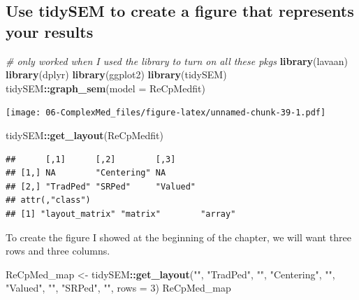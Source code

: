\documentclass[
  11pt,
]{book}
\newenvironment{Shaded}{\begin{snugshade}}{\end{snugshade}}
\newcommand{\AttributeTok}[1]{\textcolor[rgb]{0.27,0.27,0.27}{#1}}
\newcommand{\CommentTok}[1]{\textcolor[rgb]{0.37,0.37,0.37}{\textit{#1}}}
\newcommand{\DecValTok}[1]{\textcolor[rgb]{0.06,0.06,0.06}{#1}}
\newcommand{\FunctionTok}[1]{\textcolor[rgb]{0.27,0.27,0.27}{\textbf{#1}}}
\newcommand{\NormalTok}[1]{#1}
\newcommand{\OtherTok}[1]{\textcolor[rgb]{0.37,0.37,0.37}{#1}}
\newcommand{\SpecialCharTok}[1]{\textcolor[rgb]{0.43,0.43,0.43}{\textbf{#1}}}
\newcommand{\StringTok}[1]{\textcolor[rgb]{0.5,0.5,0.5}{#1}}
\begin{document}
\hypertarget{use-tidysem-to-create-a-figure-that-represents-your-results-1}{%
\subsection*{Use tidySEM to create a figure that represents your results}\label{use-tidysem-to-create-a-figure-that-represents-your-results-1}}


\begin{Shaded}
\begin{Highlighting}[]
\CommentTok{\# only worked when I used the library to turn on all these pkgs}
\FunctionTok{library}\NormalTok{(lavaan)}
\FunctionTok{library}\NormalTok{(dplyr)}
\FunctionTok{library}\NormalTok{(ggplot2)}
\FunctionTok{library}\NormalTok{(tidySEM)}
\NormalTok{tidySEM}\SpecialCharTok{::}\FunctionTok{graph\_sem}\NormalTok{(}\AttributeTok{model =}\NormalTok{ ReCpMedfit)}
\end{Highlighting}
\end{Shaded}

\texttt{[image: 06-ComplexMed\_files/figure-latex/unnamed-chunk-39-1.pdf]}

\begin{Shaded}
\begin{Highlighting}[]
\NormalTok{tidySEM}\SpecialCharTok{::}\FunctionTok{get\_layout}\NormalTok{(ReCpMedfit)}
\end{Highlighting}
\end{Shaded}

\begin{verbatim}
##      [,1]      [,2]        [,3]    
## [1,] NA        "Centering" NA      
## [2,] "TradPed" "SRPed"     "Valued"
## attr(,"class")
## [1] "layout_matrix" "matrix"        "array"
\end{verbatim}

To create the figure I showed at the beginning of the chapter, we will want three rows and three columns.

\begin{Shaded}
\begin{Highlighting}[]
\NormalTok{ReCpMed\_map }\OtherTok{\textless{}{-}}\NormalTok{ tidySEM}\SpecialCharTok{::}\FunctionTok{get\_layout}\NormalTok{(}\StringTok{""}\NormalTok{, }\StringTok{"TradPed"}\NormalTok{, }\StringTok{""}\NormalTok{, }\StringTok{"Centering"}\NormalTok{, }\StringTok{""}\NormalTok{,}
    \StringTok{"Valued"}\NormalTok{, }\StringTok{""}\NormalTok{, }\StringTok{"SRPed"}\NormalTok{, }\StringTok{""}\NormalTok{, }\AttributeTok{rows =} \DecValTok{3}\NormalTok{)}
\NormalTok{ReCpMed\_map}
\end{Highlighting}
\end{Shaded}
\end{document}
